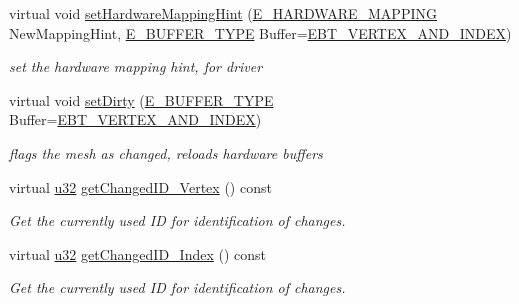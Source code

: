 \begin{DoxyCompactItemize}
virtual void \hyperlink{classirr_1_1scene_1_1IDynamicMeshBuffer_a8286f22fc7967422e2ddb5c183473247}{set\+Hardware\+Mapping\+Hint} (\hyperlink{namespaceirr_1_1scene_ac7d8ee8d77da75f2580bb9bb17231c27}{E\+\_\+\+H\+A\+R\+D\+W\+A\+R\+E\+\_\+\+M\+A\+P\+P\+I\+NG} New\+Mapping\+Hint, \hyperlink{namespaceirr_1_1scene_a8f59a89ffef0ad8e5b2c2cb874a93e8c}{E\+\_\+\+B\+U\+F\+F\+E\+R\+\_\+\+T\+Y\+PE} Buffer=\hyperlink{namespaceirr_1_1scene_a8f59a89ffef0ad8e5b2c2cb874a93e8ca833624730c30cffccc121fe31aa0832c}{E\+B\+T\+\_\+\+V\+E\+R\+T\+E\+X\+\_\+\+A\+N\+D\+\_\+\+I\+N\+D\+EX})
\begin{DoxyCompactList}\small\item\em set the hardware mapping hint, for driver \end{DoxyCompactList}\item 
\mbox{\label{classirr_1_1scene_1_1IDynamicMeshBuffer_aed99e87534a2507c30362a20f4c43277}} 
virtual void \hyperlink{classirr_1_1scene_1_1IDynamicMeshBuffer_aed99e87534a2507c30362a20f4c43277}{set\+Dirty} (\hyperlink{namespaceirr_1_1scene_a8f59a89ffef0ad8e5b2c2cb874a93e8c}{E\+\_\+\+B\+U\+F\+F\+E\+R\+\_\+\+T\+Y\+PE} Buffer=\hyperlink{namespaceirr_1_1scene_a8f59a89ffef0ad8e5b2c2cb874a93e8ca833624730c30cffccc121fe31aa0832c}{E\+B\+T\+\_\+\+V\+E\+R\+T\+E\+X\+\_\+\+A\+N\+D\+\_\+\+I\+N\+D\+EX})
\begin{DoxyCompactList}\small\item\em flags the mesh as changed, reloads hardware buffers \end{DoxyCompactList}\item 
virtual \hyperlink{namespaceirr_a0416a53257075833e7002efd0a18e804}{u32} \hyperlink{classirr_1_1scene_1_1IDynamicMeshBuffer_a3480aae22a6701453a19b4c4cbcf2555}{get\+Changed\+I\+D\+\_\+\+Vertex} () const
\begin{DoxyCompactList}\small\item\em Get the currently used ID for identification of changes. \end{DoxyCompactList}\item 
virtual \hyperlink{namespaceirr_a0416a53257075833e7002efd0a18e804}{u32} \hyperlink{classirr_1_1scene_1_1IDynamicMeshBuffer_a2514a3d0e4865b7b9714fe1f9f58ad51}{get\+Changed\+I\+D\+\_\+\+Index} () const
\begin{DoxyCompactList}\small\item\em Get the currently used ID for identification of changes. \end{DoxyCompactList}\item 

\end{DoxyCompactItemize}

